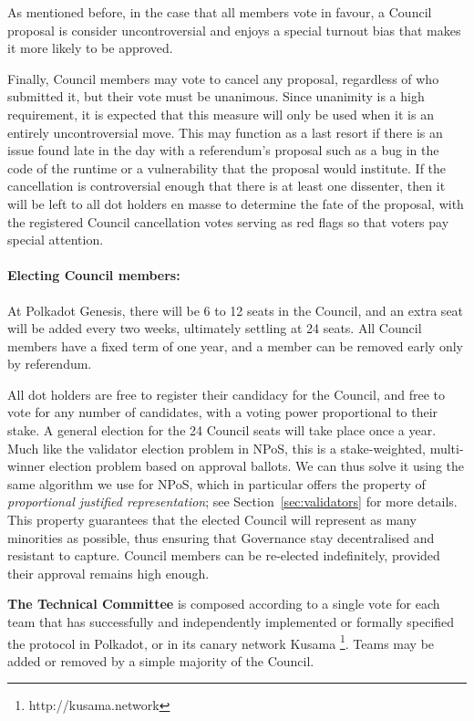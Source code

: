 As mentioned before, in the case that all members vote in favour, a Council proposal is consider uncontroversial and enjoys a special turnout bias that makes it more likely to be approved. 

Finally, Council members may vote to cancel any proposal, regardless of who submitted it, but their vote must be unanimous. Since unanimity is a high requirement, it is expected that this measure will only be used when it is an entirely uncontroversial move. This may function as a last resort if there is an issue found late in the day with a referendum's proposal such as a bug in the code of the runtime or a vulnerability  that the proposal would institute. If the cancellation is controversial enough that there is at least one dissenter, then it will be left to all dot holders en masse to determine the fate of the proposal, with the registered Council cancellation votes serving as red flags so that voters pay special attention.

\paragraph{Electing Council members:} At Polkadot Genesis, there will be 6 to 12 seats in the Council, and an extra seat will be added every two weeks, ultimately settling at 24 seats.  All Council members have a fixed term of one year, and a member can be removed early only by referendum. 

All dot holders are free to register their candidacy for the Council, and free to vote for any number of candidates, with a voting power proportional to their stake. A general election for the 24 Council seats will take place once a year. Much like the validator election problem in NPoS, this is a stake-weighted, multi-winner election problem based on approval ballots. We can thus solve it using the same algorithm we use for NPoS, which in particular offers the property of \emph{proportional justified representation}; see Section~\ref{sec:validators} for more details. This property guarantees that the elected Council will represent as many minorities as possible, thus ensuring that Governance stay decentralised and resistant to capture. Council members can be re-elected indefinitely, provided their approval remains high enough. 

\medskip

\textbf{The Technical Committee} is composed according to a single vote for each team that has successfully and independently implemented or formally specified the protocol in Polkadot, or in its canary network Kusama \footnote{http://kusama.network}. Teams may be added or removed by a simple majority of the Council. 

